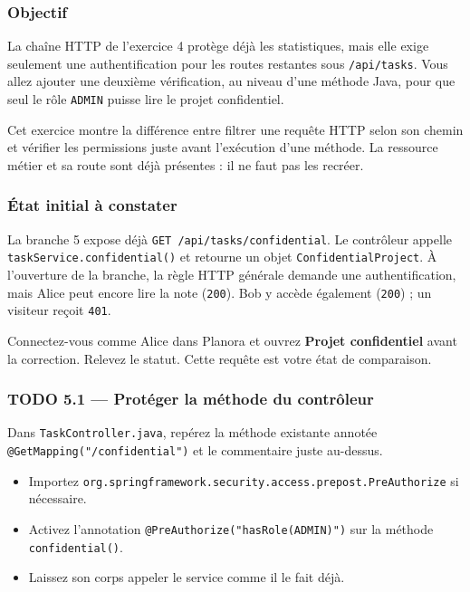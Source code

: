 \documentclass[
  french,
  10pt,
  a4paper,
]{article}
\providecommand{\tightlist}{%
  \setlength{\itemsep}{0pt}\setlength{\parskip}{0pt}}
\begin{document}
\subsubsection{Objectif}\label{objectif-3}

La chaîne HTTP de l'exercice 4 protège déjà les statistiques, mais elle
exige seulement une authentification pour les routes restantes sous
\texttt{/api/tasks}. Vous allez ajouter une deuxième vérification, au
niveau d'une méthode Java, pour que seul le rôle \texttt{ADMIN} puisse
lire le projet confidentiel.

Cet exercice montre la différence entre filtrer une requête HTTP selon
son chemin et vérifier les permissions juste avant l'exécution d'une
méthode. La ressource métier et sa route sont déjà présentes : il ne
faut pas les recréer.

\subsubsection{État initial à
constater}\label{uxe9tat-initial-uxe0-constater}

La branche 5 expose déjà \texttt{GET\ /api/tasks/confidential}. Le
contrôleur appelle \texttt{taskService.confidential()} et retourne un
objet \texttt{ConfidentialProject}. À l'ouverture de la branche, la
règle HTTP générale demande une authentification, mais Alice peut encore
lire la note (\texttt{200}). Bob y accède également (\texttt{200}) ; un
visiteur reçoit \texttt{401}.

Connectez-vous comme Alice dans Planora et ouvrez \textbf{Projet
confidentiel} avant la correction. Relevez le statut. Cette requête est
votre état de comparaison.

\subsubsection{TODO 5.1 --- Protéger la méthode du
contrôleur}\label{todo-5.1-protuxe9ger-la-muxe9thode-du-contruxf4leur}

Dans \texttt{TaskController.java}, repérez la méthode existante annotée
\texttt{@GetMapping("/confidential")} et le commentaire juste au-dessus.

\begin{itemize}
\tightlist
\item
  Importez
  \texttt{org.springframework.security.access.prepost.PreAuthorize} si
  nécessaire.
\item
  Activez l'annotation
  \texttt{@PreAuthorize("hasRole(\textquotesingle{}ADMIN\textquotesingle{})")}
  sur la méthode \texttt{confidential()}.
\item
  Laissez son corps appeler le service comme il le fait déjà.
\end{itemize}
\end{document}
